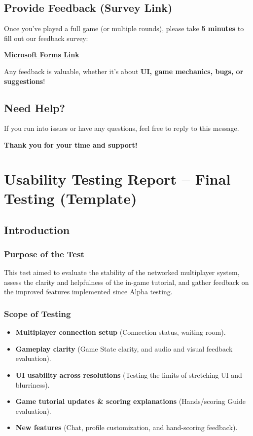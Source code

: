 \documentclass{article}
\begin{document}
\subsection{Provide Feedback (Survey Link)}

Once you’ve played a full game (or multiple rounds), please take \textbf{5 minutes} to fill out our feedback survey:

\href{https://forms.office.com/r/gp8yrLXu9v}{\textbf{Microsoft Forms Link}}

Any feedback is valuable, whether it's about \textbf{UI, game mechanics, bugs, or suggestions}!

\subsection{Need Help?}
If you run into issues or have any questions, feel free to reply to this message.

\bigskip

\begin{center}
\textbf{Thank you for your time and support!}
\end{center}


\section{Usability Testing Report – Final Testing (Template)}

\subsection{Introduction}

\subsubsection{Purpose of the Test}
This test aimed to evaluate the stability of the networked multiplayer system, assess the clarity and helpfulness of the in-game tutorial, and gather feedback on the improved features implemented since Alpha testing.

\subsubsection{Scope of Testing}
\begin{itemize}
    \item \textbf{Multiplayer connection setup} (Connection status, waiting room).
    \item \textbf{Gameplay clarity} (Game State clarity, and audio and visual feedback evaluation).
    \item \textbf{UI usability across resolutions} (Testing the limits of stretching UI and blurriness).
    \item \textbf{Game tutorial updates \& scoring explanations} (Hands/scoring Guide evaluation).
    \item \textbf{New features} (Chat, profile customization, and hand-scoring feedback).
\end{itemize}
\end{document}
